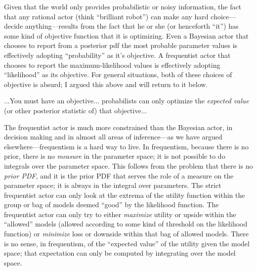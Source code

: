 \documentclass[12pt,twoside,pdftex]{article}
\begin{document}
Given that the world only provides probabilistic or noisy information,
the fact that any rational actor (think ``brilliant robot'')  can make any hard choice---decide anything---results
from the fact that he or she (or henceforth ``it'') has some kind of
objective function that it is optimizing.  Even a Bayesian actor that
chooses to report from a posterior pdf the most probable parameter
values is effectively adopting ``probability'' as it's objective.  A
frequentist actor that chooses to report the maximum-likelihood values
is effectively adopting ``likelihood'' as its objective.  For general
situations, both of these choices of objective is absurd; I argued
this above and will return to it below.

...You must have an objective... probabilists can only optimize the
\emph{expected value} (or other posterior statistic of) that
objective...

The frequentist actor is much more constrained than the Bayesian
actor, in decision making and in almost all areas of inference---as we
have argued elsewhere---frequentism is a hard way to live.  In frequentism, because there is no prior, there is
no \emph{measure} in the parameter space; it is not possible to do
integrals over the parameter space.  This follows from the problem
that there is no \emph{prior PDF}, and it is the prior PDF that serves
the role of a measure on the parameter space; it is always in the
integral over parameters.  The strict frequentist actor can only look
at the extrema of the utility function within the group or bag of
models deemed ``good'' by the likelihood function.  The frequentist
actor can only try to either \emph{maximize} utility or upside within
the ``allowed'' models (allowed according to some kind of threshold on
the likelihood function)
or \emph{minimize} loss or downside within that bag of allowed models.
There is no sense, in frequentism, of the ``expected value'' of the
utility given the model space; that expectation can only be computed
by integrating over the model space.
\end{document}
